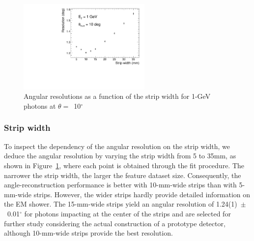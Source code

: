 \documentclass[12pt,times,draftclsnofoot,a4paper]{elsarticle}
\begin{document}
\begin{figure}[!hbt]
\centering
\includegraphics[width=0.58\textwidth]{Fig5_width_including7.5_12.5mm.pdf}
\caption{ Angular resolutions as a function of the strip width for 1-GeV photons at $\theta=$~10$^{\circ}$ }
\label{fig:angle_reco_width}
\end{figure}
\subsubsection{Strip width}
To inspect the dependency of the angular resolution on the strip width, we deduce the angular resolution by varying the strip width from 5 to 35mm, as shown in Figure~\ref{fig:angle_reco_width}, where each point is obtained through the fit procedure. The narrower the strip width, the larger the feature dataset size. Consequently, the angle-reconstruction performance is better with 10-mm-wide strips than with 5-mm-wide strips. However, the wider strips hardly provide detailed information on the EM shower. The 15-mm-wide strips yield an angular resolution of 1.24(1)~$\pm$~0.01$^{\circ}$ for photons impacting at the center of the strips and are selected for further study considering the actual construction of a prototype detector, although 10-mm-wide strips provide the best resolution.
\end{document}
